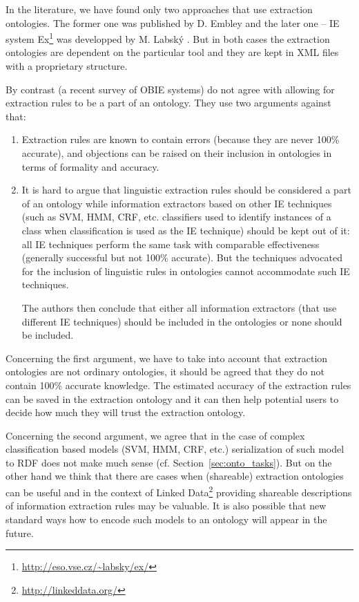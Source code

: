 In the literature, we have found only two approaches that use extraction ontologies. The former one was published by D. Embley \citep{DBLP:conf/er/EmbleyTL02,Embley:2004:TSU:1012294.1012295}
and the later one -- IE system Ex\footnote{\url{http://eso.vse.cz/~labsky/ex/}} was developped by M. Labsk\'{y} \citep{springerlink:10.1007/978-3-642-01891-6_5}. 
But in both cases the extraction ontologies are dependent on the particular tool and they are kept in XML files with a proprietary structure.


By contrast \cite{citeulike:7291004} (a recent survey of OBIE systems) do not agree with allowing for extraction rules to be a part of an ontology. They use two arguments against that:
\begin{enumerate}
	\item Extraction rules are known to contain errors (because they are never 100\% accurate), and objections can be raised on their inclusion in ontologies in terms of formality and accuracy.

	\item It is hard to argue that linguistic extraction rules should be considered a part of an ontology while information extractors based on other IE techniques (such as SVM, HMM, CRF, etc. classifiers used to identify instances of a class when classification is used as the IE technique) should be kept out of it: all IE techniques perform the same task with comparable effectiveness (generally successful but not 100\% accurate). But the techniques advocated for the inclusion of linguistic rules in ontologies cannot accommodate such IE techniques.
	
The authors then conclude that either all information extractors (that use different IE techniques) should be included in the ontologies or none should be included.
\end{enumerate}



Concerning the first argument, we have to take into account that extraction ontologies are not ordinary ontologies, it should be agreed that they do not contain 100\% accurate knowledge. The estimated accuracy of the extraction rules can be saved in the extraction ontology and it can then help potential users to decide how much they will trust the extraction ontology.

Concerning the second argument, we agree that in the case of complex classification based models (SVM, HMM, CRF, etc.) serialization of such model to RDF does not make much sense (cf. Section~\ref{sec:onto_tasks}). But on the other hand we think that there are cases when (shareable) extraction ontologies can be useful and in the context of Linked Data\footnote{\url{http://linkeddata.org/}} providing shareable descriptions of information extraction rules may be valuable. It is also possible that new standard ways how to encode such models to an ontology will appear in the future.



